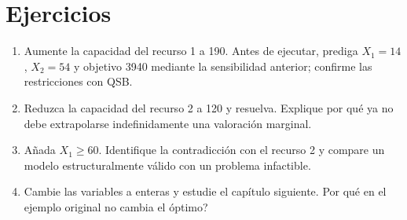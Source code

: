 \section{Ejercicios}
\begin{enumerate}
 \item Aumente la capacidad del recurso 1 a 190. Antes de ejecutar, prediga
 \(X_1=14\), \(X_2=54\) y objetivo 3940 mediante la sensibilidad anterior;
 confirme las restricciones con QSB.
 \item Reduzca la capacidad del recurso 2 a 120 y resuelva. Explique por qué
 ya no debe extrapolarse indefinidamente una valoración marginal.
 \item Añada \(X_1\geq60\). Identifique la contradicción con el recurso 2 y
 compare un modelo estructuralmente válido con un problema infactible.
 \item Cambie las variables a enteras y estudie el capítulo siguiente.
 \textquestiondown{}Por qué en el ejemplo original no cambia el óptimo?
\end{enumerate}
